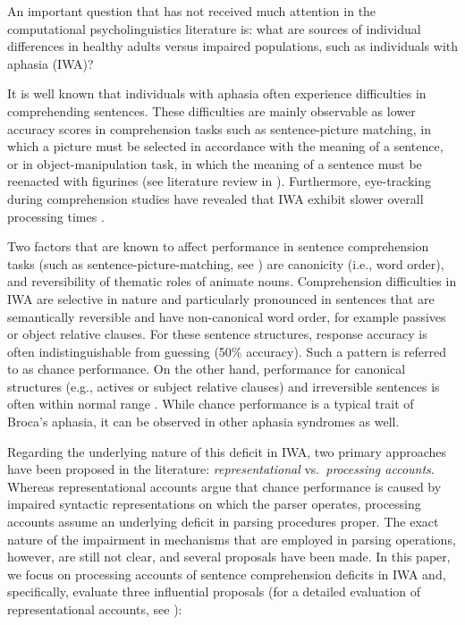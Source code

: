 \documentclass{cambridge7A}\usepackage[]{graphicx}\usepackage[]{color}
\begin{document}
An important question that has not received much attention in the computational psycholinguistics literature is: what are sources of individual differences in healthy adults versus impaired populations, such as individuals with aphasia (IWA)? 

It is well known that individuals with aphasia often experience difficulties in comprehending sentences. These difficulties are mainly observable as lower accuracy scores in comprehension tasks such as sentence-picture matching, in which a picture must be selected in accordance with the meaning of a sentence, or in object-manipulation task, in which the meaning of a sentence must be reenacted with figurines (see literature review in \cite{PatilEtAl2016}). Furthermore, eye-tracking during comprehension studies have revealed that IWA exhibit slower overall processing times \citep{hanneetal11}.

Two factors that are known to affect performance in sentence comprehension tasks (such as sentence-picture-matching, see \cite{hanneetal11}) are canonicity (i.e., word order), and reversibility of thematic roles of animate nouns. Comprehension difficulties in IWA are selective in nature and particularly pronounced in sentences that are semantically reversible and have non-canonical word order, for example passives or object relative clauses. For these sentence structures, response accuracy is often indistinguishable from guessing (50\% accuracy). Such a pattern is referred to as chance performance. On the other hand, performance for canonical structures (e.g., actives or subject relative clauses) and irreversible sentences is often within normal range \citep{hanneetal11}. While chance performance is a typical trait of Broca's aphasia, it can be observed in other aphasia syndromes as well.

Regarding the underlying nature of this deficit in IWA, two primary approaches have been proposed in the literature: \emph{representational} vs.\ \emph{processing accounts}. Whereas representational accounts \citep{Grodzinsky:1995} argue that chance performance is caused by impaired syntactic representations on which the parser operates, processing accounts assume an underlying deficit in parsing procedures proper. The exact nature of the impairment in mechanisms that are employed in parsing operations, however, are still not clear, and several proposals have been made. In this paper, we focus on processing accounts of sentence comprehension deficits in IWA and, specifically, evaluate three influential proposals  (for a detailed evaluation of representational accounts, see \cite{PatilEtAl2016}):
\end{document}
